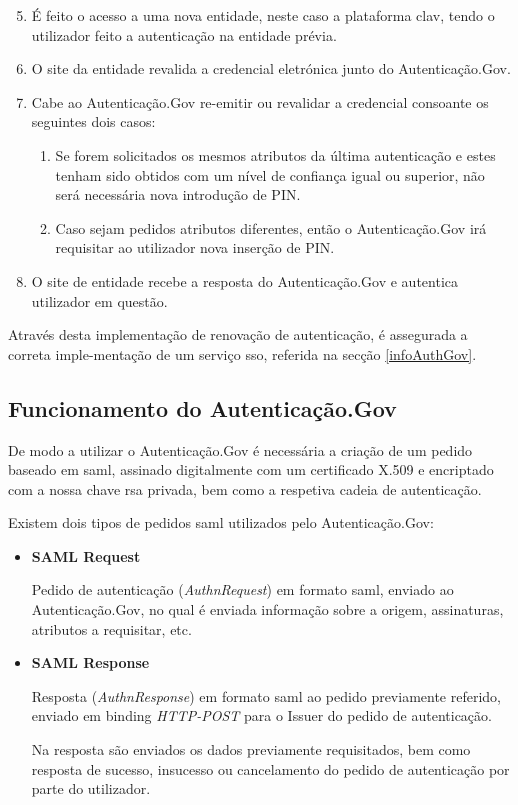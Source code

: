 \begin{enumerate}
    \setcounter{enumi}{4}
    \item É feito o acesso a uma nova entidade, neste caso a plataforma \gls{clav}, tendo o utilizador feito a autenticação na entidade prévia.
    \item O site da entidade revalida a credencial eletrónica junto do Autenticação.Gov.
    \item Cabe ao Autenticação.Gov re-emitir ou revalidar a credencial consoante os seguintes dois casos:
    \begin{enumerate}
        \item Se forem solicitados os mesmos atributos da última autenticação e estes tenham sido obtidos com um nível de confiança igual ou superior, não será necessária nova introdução de PIN.
        \item Caso sejam pedidos atributos diferentes, então o Autenticação.Gov irá requisitar ao utilizador nova inserção de PIN.
    \end{enumerate}
    \item O site de entidade recebe a resposta do Autenticação.Gov e autentica utilizador em questão.
\end{enumerate}

Através desta implementação de renovação de autenticação, é assegurada a correta imple-mentação de um serviço \gls{sso}, referida na secção \ref{infoAuthGov}.

\cleardoublepage
\subsection{Funcionamento do Autenticação.Gov} \label{funcAuthGov}

De modo a utilizar o Autenticação.Gov é necessária a criação de um pedido baseado em \gls{saml}, assinado digitalmente com um certificado X.509 e encriptado com a nossa chave \gls{rsa} privada, bem como a respetiva cadeia de autenticação.

Existem dois tipos de pedidos \gls{saml} utilizados pelo Autenticação.Gov:

\begin{itemize}
    \item \textbf{SAML Request}
    
    Pedido de autenticação (\emph{AuthnRequest}) em formato \gls{saml}, enviado ao Autenticação.Gov, no qual é enviada informação sobre a origem, assinaturas, atributos a requisitar, etc.
    
    \item \textbf{SAML Response}
    
    Resposta (\emph{AuthnResponse}) em formato \gls{saml} ao pedido previamente referido, enviado em binding \emph{HTTP-POST} para o Issuer do pedido de autenticação.
    
    Na resposta são enviados os dados previamente requisitados, bem como resposta de sucesso, insucesso ou cancelamento do pedido de autenticação por parte do utilizador.
\end{itemize}

